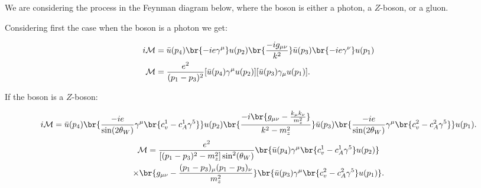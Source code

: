 \section{}

We are considering the process in the Feynman diagram below, where the boson is either a photon, a $Z$-boson, or a gluon.

\begin{center}
\end{center}

Considering first the case when the boson is a photon we get:

\begin{align}
  i\mathcal{M} &= \bar{u}(p_4)\br{-ie\gamma^\mu}u(p_2) \br{\frac{-ig_{\mu\nu}}{k^2}} \bar{u}(p_3)\br{-ie\gamma^\nu}u(p_1) \\
  \mathcal{M} &= \frac{e^2}{(p_1 - p_3)^2} [\bar{u}(p_4)\gamma^\mu u(p_2)][\bar{u}(p_3) \gamma_\mu u(p_1)].
\end{align}

If the boson is a $Z$-boson:

\begin{equation}
  i\mathcal{M} = \bar{u}(p_4) \br{\frac{-ie}{\sin(2\theta_W)}\gamma^\mu\br{c_v^1 - c_A^1\gamma^5}} u(p_2) \br{\frac{-i\br{g_{\mu\nu} - \frac{k_\mu k_\nu}{m_z^2}}}{k^2 - m_z^2}} \bar{u}(p_3)\br{\frac{-ie}{\sin(2\theta_W)}\gamma^\mu\br{c_v^2 - c_A^2\gamma^5}}u(p_1).
\end{equation}
\begin{multline}
  \mathcal{M} = \frac{e^2}{[(p_1 - p_3)^2 - m_z^2]\sin^2(\theta_W)} \br{\bar{u}(p_4) \gamma^\mu \br{c_v^1 - c_A^1\gamma^5}u(p_2)} \\ \times
  \br{g_{\mu\nu} - \frac{(p_1 - p_3)_\mu (p_1 - p_3)_\nu}{m_z^2}}\br{\bar{u}(p_3) \gamma^\mu \br{c_v^2 - c_A^2\gamma^5}u(p_1)}.
\end{multline}


